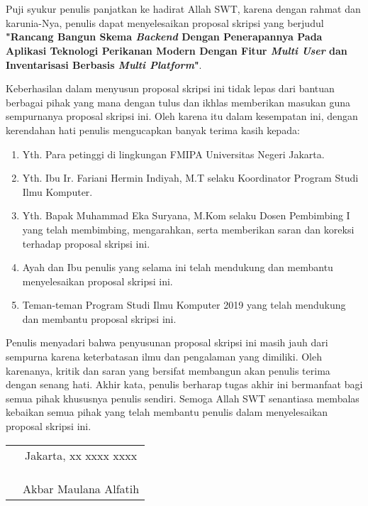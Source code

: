 \chapter*{}

Puji syukur penulis panjatkan ke hadirat Allah SWT, karena dengan rahmat dan karunia-Nya, penulis dapat menyelesaikan proposal skripsi yang berjudul \textbf{"Rancang Bangun Skema \emph{Backend} Dengan Penerapannya Pada Aplikasi Teknologi Perikanan Modern Dengan Fitur \emph{Multi User} dan Inventarisasi Berbasis \emph{Multi Platform}"}.

Keberhasilan dalam menyusun proposal skripsi ini tidak lepas dari bantuan berbagai pihak yang mana dengan tulus dan ikhlas memberikan masukan guna sempurnanya proposal skripsi ini. Oleh karena itu dalam kesempatan ini, dengan kerendahan hati penulis mengucapkan banyak terima kasih kepada:

\begin{enumerate}

	\item{Yth. Para petinggi di lingkungan FMIPA Universitas Negeri Jakarta.}
	\item{Yth. Ibu Ir. Fariani Hermin Indiyah, M.T selaku Koordinator Program Studi Ilmu Komputer.}
	\item{Yth. Bapak Muhammad Eka Suryana, M.Kom selaku Dosen Pembimbing I yang telah membimbing, mengarahkan, serta memberikan saran dan koreksi terhadap proposal skripsi ini.}
	\item{Ayah dan Ibu penulis yang selama ini telah mendukung dan membantu menyelesaikan proposal skripsi ini.}
	\item{Teman-teman Program Studi Ilmu Komputer 2019 yang telah mendukung dan membantu proposal skripsi ini.}
	
\end{enumerate}

Penulis menyadari bahwa penyusunan proposal skripsi ini masih jauh dari sempurna karena keterbatasan ilmu dan pengalaman yang dimiliki. Oleh karenanya, kritik dan saran yang bersifat membangun akan penulis terima dengan senang hati. Akhir kata, penulis berharap tugas akhir ini bermanfaat bagi semua pihak khususnya penulis sendiri. Semoga Allah SWT senantiasa membalas kebaikan semua pihak yang telah membantu penulis dalam menyelesaikan proposal skripsi ini.

\vspace{4cm}

\begin{tabular}{p{7.5cm}c}
	&Jakarta, xx xxxx xxxx\\
	&\\
	&\\
	&\\
	&Akbar Maulana Alfatih
\end{tabular}